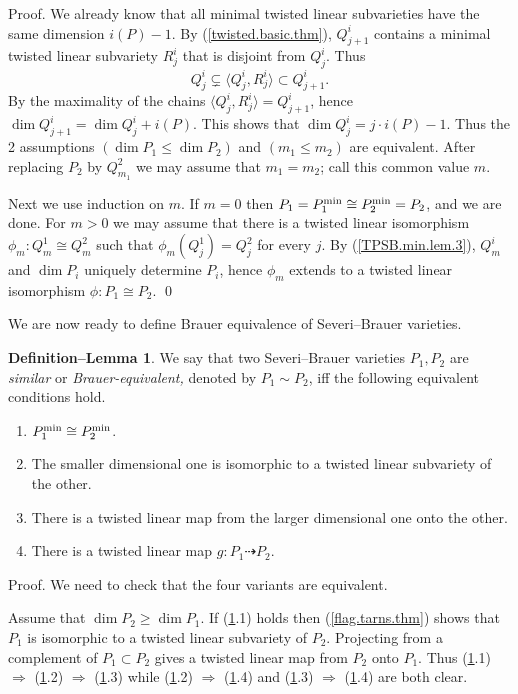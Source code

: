 \documentclass{amsart}
\theoremstyle{definition}
\newtheorem{defn-lem}[thm]{Definition--Lemma}  %
\theoremstyle{remark}
\newcommand{\map}[0]{\dasharrow}
\begin{document}
Proof.
We already know that all minimal twisted linear subvarieties
have the same dimension $i(P)-1$. By (\ref{twisted.basic.thm}),
 $Q^i_{j+1}$ contains a minimal twisted linear subvariety  $R^i_j$ that is disjoint from  $Q^i_j$.  Thus
$$
Q^i_j\subsetneq \langle Q^i_j, R^i_j\rangle \subset Q^i_{j+1}.
$$
By the maximality of the chains $\langle Q^i_j, R^i_j\rangle = Q^i_{j+1}$,
hence $\dim Q^i_{j+1}=\dim Q^i_{j}+ i(P)$. This shows that
$\dim Q^i_{j}=j\cdot i(P)-1$. Thus the 2 assumptions
$(\dim P_1\leq \dim P_2)$ and 
$(m_1\leq m_2)$ are equivalent.
 After replacing $P_2$ by $Q^2_{m_1}$ we may assume that 
$m_1=m_2$; call this common value  $m$. 

Next we use induction on $m$. 
If $m=0$ then $P_1=P_1^{\rm min}\cong P_2^{\rm min}=P_2$, and we are done.
For $m>0$ we may assume that there is a twisted linear  isomorphism $\phi_m: Q^1_m\cong Q^2_m$ such that
$\phi_m(Q^1_j)=Q^2_j$ for every $j$.
By (\ref{TPSB.min.lem.3}), $Q^i_m$ and $\dim P_i$ uniquely determine $P_i$, hence
$\phi_m$ extends to a twisted linear  isomorphism $\phi: P_1\cong P_2$. \qed



\medskip
We are now ready to define Brauer equivalence of
Severi--Brauer varieties. 

\begin{defn-lem}\label{Br.eq.def.lem}
We say that two Severi--Brauer varieties $P_1, P_2$ are 
{\it similar} or {\it Brauer-equivalent,}
denoted by $P_1\sim P_2$, iff the following equivalent conditions hold.
\begin{enumerate}
\item $P_1^{\rm min}\cong P_2^{\rm min}$.
\item The smaller dimensional one  is
isomorphic to a twisted linear subvariety of the other.
\item There is a   twisted linear map  from the larger 
dimensional one onto the other.
\item There is a   twisted linear map  $g:P_1\map P_2$. 
\end{enumerate}
\end{defn-lem}


Proof. We need to check that the four variants are equivalent.


Assume that $\dim P_2\geq \dim P_1$. 
If (\ref{Br.eq.def.lem}.1) holds then (\ref{flag.tarns.thm}) shows that 
$P_1$ is isomorphic to a twisted linear subvariety of $P_2$.
Projecting from a complement of $P_1\subset P_2$ gives a
twisted linear map  from $P_2$ onto $P_1$. Thus
(\ref{Br.eq.def.lem}.1) $\Rightarrow$ (\ref{Br.eq.def.lem}.2) $\Rightarrow$ (\ref{Br.eq.def.lem}.3) while
(\ref{Br.eq.def.lem}.2) $\Rightarrow$ (\ref{Br.eq.def.lem}.4)
and (\ref{Br.eq.def.lem}.3) $\Rightarrow$ (\ref{Br.eq.def.lem}.4) are both clear.
\end{document}
